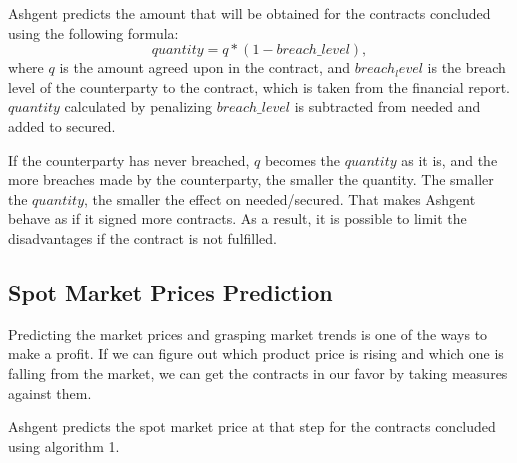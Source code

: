 \documentclass[10pt]{article}
\begin{document}
Ashgent predicts the amount that will be obtained for the contracts concluded using the following formula:
\begin{equation}
    quantity = q * (1 -  breach\_level),
\end{equation}
where $q$ is the amount agreed upon in the contract, and $breach_level$ is the breach level of the counterparty to the contract, which is taken from the financial report.
$quantity$ calculated by penalizing $breach\_level$ is subtracted from needed and added to secured.

If the counterparty has never breached, $q$ becomes the $quantity$ as it is, and the more breaches made by the counterparty, the smaller the quantity.
The smaller the $quantity$, the smaller the effect on needed/secured.
That makes Ashgent behave as if it signed more contracts.
As a result, it is possible to limit the disadvantages if the contract is not fulfilled.


\subsection{Spot Market Prices Prediction}
Predicting the market prices and grasping market trends is one of the ways to make a profit.
If we can figure out which product price is rising and which one is falling from the market, we can get the contracts in our favor by taking measures against them.


Ashgent predicts the spot market price at that step for the contracts concluded using algorithm 1.
\end{document}
